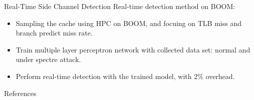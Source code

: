 \documentclass{beamer}
\begin{document}
\begin{frame}{Real-Time Side Channel Detection\cite{le-2021}}
Real-time detection method on BOOM:
\begin{itemize}[<+->]
    \item Sampling the cache using HPC on BOOM, and focuing on TLB miss and branch predict miss rate.
    \item Train multiple layer perceptron network with collected data set: normal and under spectre attack.
    \item Perform real-time detection with the trained model, with 2\% overhead.
\end{itemize}
\end{frame}

\begin{frame}[allowframebreaks]{References}
\tiny
\printbibliography
\end{frame}
\end{document}
